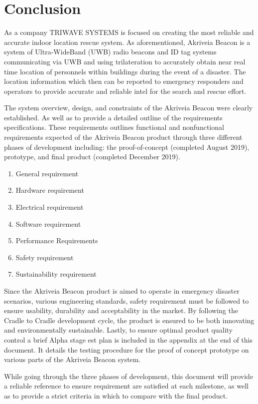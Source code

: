 %

\setcounter{section}{4}
\section{Conclusion}
\bigskip
As a company TRIWAVE SYSTEMS is focused on creating the most reliable and accurate indoor location rescue system. As aforementioned, Akriveia Beacon is a system of Ultra-WideBand (UWB) radio beacons and ID tag systems communicating via UWB and using trilateration to accurately obtain near real time location of personnels within buildings during the event of a disaster. The location information which then can be reported to emergency responders and operators to provide accurate and reliable intel for the search and rescue effort. 

\bigskip
The system overview, design, and constraints of the Akriveia Beacon were clearly established. As well as to provide a detailed outline of the requirements specifications. These requirements outlines functional and nonfunctional requirements expected of the Akriveia Beacon product through three different phases of development including: the proof-of-concept (completed August 2019), prototype, and final product (completed December 2019).

\begin{enumerate}
	\item General requirement 
	\item Hardware requirement 
	\item Electrical requirement 
	\item Software requirement 
	\item Performance Requirements
	\item Safety requirement 
	\item Sustainability  requirement 
\end{enumerate}


Since the Akriveia Beacon product is aimed to operate in emergency disaster scenarios, various engineering standards, safety requirement must be followed to ensure usability, durability and acceptability in the market. By following the Cradle to Cradle development cycle, the product is ensured to be both innovating and environmentally sustainable. Lastly, to ensure optimal product quality control a brief Alpha stage est plan is included in the appendix at the end of this document. It details the testing procedure for the proof of concept prototype on various parts of the Akriveia Beacon system.

\bigskip
While going through the three phases of development, this document will provide a reliable
reference to ensure requirement are satisfied at each milestone, as well as to provide a strict criteria in which to compare with the final product.

%